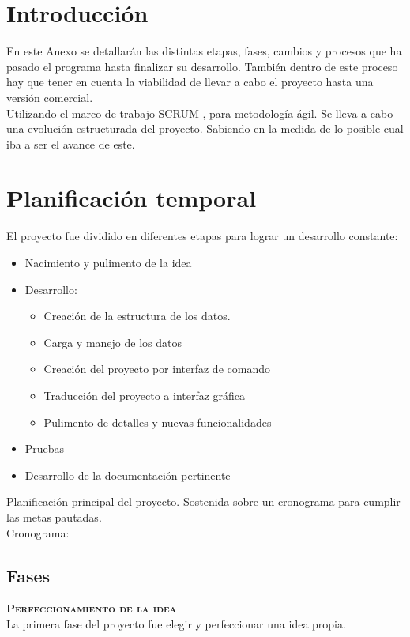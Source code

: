 
\section{Introducción}
En este Anexo se detallarán las distintas etapas, fases, cambios y procesos que ha pasado el programa hasta finalizar su desarrollo. También dentro de este proceso hay que tener en cuenta la viabilidad de llevar a cabo el proyecto hasta una versión comercial.
\\
Utilizando el marco de trabajo SCRUM \cite{scrum}, para metodología ágil. Se lleva a cabo una evolución estructurada del proyecto. Sabiendo en la medida de lo posible cual iba a ser el avance de este.
\\

\section{Planificación temporal}
El proyecto fue dividido en diferentes etapas para lograr un desarrollo constante:
\begin{itemize}
\item Nacimiento y pulimento de la idea
\item Desarrollo:
\begin{itemize}
\item Creación de la estructura de los datos.
\item Carga y manejo de los datos
\item Creación del proyecto por interfaz de comando
\item Traducción del proyecto a interfaz gráfica
\item Pulimento de detalles y nuevas funcionalidades
\end{itemize}
\item Pruebas
\item Desarrollo de la documentación pertinente
\end{itemize}
Planificación principal del proyecto. Sostenida sobre un cronograma para cumplir las metas pautadas.\\
Cronograma:

\subsection{Fases}
\textbf{\textsc{Perfeccionamiento de la idea}}\\
La primera fase del proyecto fue elegir y perfeccionar una idea propia.\\

